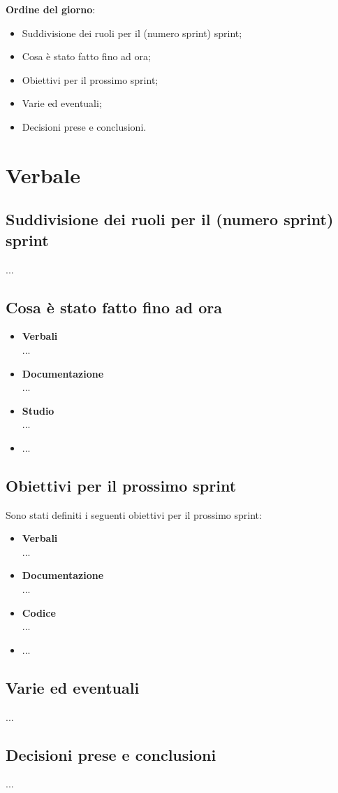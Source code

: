 \documentclass[italian,12pt]{article}
\begin{document}
\raggedright
\textbf{Ordine del giorno}:
\begin{itemize}
	\item Suddivisione dei ruoli per il (numero sprint) sprint;
	\item Cosa è stato fatto fino ad ora;
	\item Obiettivi per il prossimo sprint;
	\item Varie ed eventuali;
	\item Decisioni prese e conclusioni.
\end{itemize}


\newpage

\section{Verbale}

\subsection{Suddivisione dei ruoli per il (numero sprint) sprint}
...

\subsection{Cosa è stato fatto fino ad ora}
\begin{itemize}
	\item \textbf{Verbali} \\
	      ...
	\item \textbf{Documentazione} \\
	      ...
	\item \textbf{Studio} \\
	      ...
	\item ...
\end{itemize}

\subsection{Obiettivi per il prossimo sprint}
Sono stati definiti i seguenti obiettivi per il prossimo sprint:
\begin{itemize}
	\item \textbf{Verbali} \\
	      ...
	\item \textbf{Documentazione} \\
	      ...
	\item \textbf{Codice} \\
	      ...
	\item ...
\end{itemize}

\subsection{Varie ed eventuali}
...

\subsection{Decisioni prese e conclusioni}
...
\end{document}
